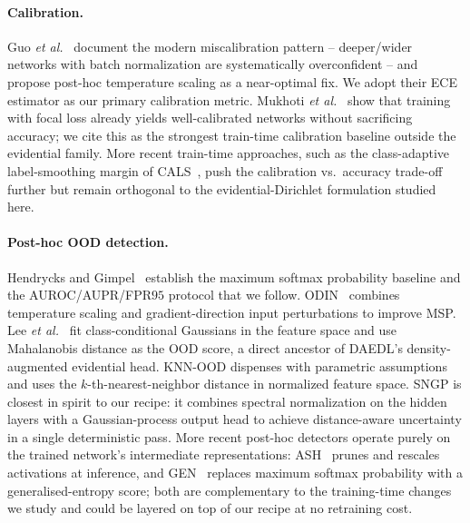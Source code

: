 \documentclass[review,5p,times]{elsarticle}
\begin{document}
\paragraph{Calibration.}
Guo \textit{et al.}~\citep{guo2017calibration} document the modern
miscalibration pattern -- deeper/wider networks with batch normalization
are systematically overconfident -- and propose post-hoc temperature
scaling as a near-optimal fix. We adopt their ECE estimator as our primary
calibration metric. Mukhoti \textit{et al.}~\citep{mukhoti2020focal} show
that training with focal loss already yields well-calibrated networks
without sacrificing accuracy; we cite this as the strongest train-time
calibration baseline outside the evidential family. More recent
train-time approaches, such as the class-adaptive label-smoothing margin
of CALS~\citep{liu2023cals}, push the calibration vs.\ accuracy
trade-off further but remain orthogonal to the evidential-Dirichlet
formulation studied here.

\paragraph{Post-hoc OOD detection.}
Hendrycks and Gimpel~\citep{hendrycks2017baseline} establish the maximum
softmax probability baseline and the AUROC/AUPR/FPR$95$ protocol that we
follow. ODIN~\citep{liang2018odin} combines temperature scaling and
gradient-direction input perturbations to improve MSP. Lee
\textit{et al.}~\citep{lee2018mahalanobis} fit class-conditional Gaussians
in the feature space and use Mahalanobis distance as the OOD score, a
direct ancestor of DAEDL's density-augmented evidential head. KNN-OOD
\citep{sun2022knn} dispenses with parametric assumptions and uses the
$k$-th-nearest-neighbor distance in normalized feature space. SNGP
\citep{liu2020sngp} is closest in spirit to our recipe: it combines
spectral normalization on the hidden layers with a Gaussian-process output
head to achieve distance-aware uncertainty in a single deterministic pass.
More recent post-hoc detectors operate purely on the trained network's
intermediate representations: ASH~\citep{djurisic2023ash} prunes and
rescales activations at inference, and GEN~\citep{liu2023gen} replaces
maximum softmax probability with a generalised-entropy score; both are
complementary to the training-time changes we study and could be layered
on top of our recipe at no retraining cost.
\end{document}
